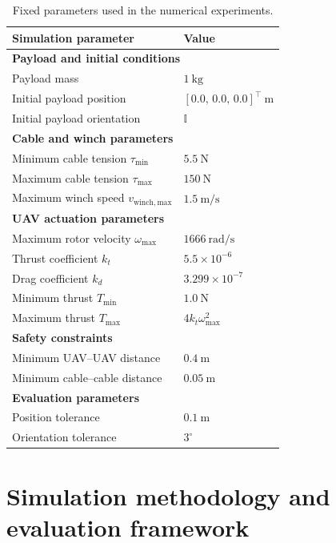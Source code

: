 \begin{table}[h]
\centering
\small
\renewcommand{\arraystretch}{0.85}
\begin{tabular}{ll}
\toprule
\textbf{Simulation parameter} & \textbf{Value} \\
\midrule
\multicolumn{2}{l}{\textbf{Payload and initial conditions}} \\
\midrule
Payload mass & $1~\mathrm{kg}$ \\
Initial payload position & $[0.0,\,0.0,\,0.0]^\top~\mathrm{m}$ \\
Initial payload orientation & $\mathbb{I}$ \\
\midrule
\multicolumn{2}{l}{\textbf{Cable and winch parameters}} \\
\midrule
Minimum cable tension $\tau_{\min}$ & $5.5~\mathrm{N}$ \\
Maximum cable tension $\tau_{\max}$ & $150~\mathrm{N}$ \\
Maximum winch speed $v_{\mathrm{winch,max}}$ & $1.5~\mathrm{m/s}$ \\
\midrule
\multicolumn{2}{l}{\textbf{UAV actuation parameters}} \\
\midrule
Maximum rotor velocity $\omega_{\max}$ & $1666~\mathrm{rad/s}$ \\
Thrust coefficient $k_t$ & $5.5\times10^{-6}$ \\
Drag coefficient $k_d$ & $3.299\times10^{-7}$ \\
Minimum thrust $T_{\min}$ & $1.0~\mathrm{N}$ \\
Maximum thrust $T_{\max}$ & $4k_t\omega_{\max}^2$ \\
\midrule
\multicolumn{2}{l}{\textbf{Safety constraints}} \\
\midrule
Minimum UAV--UAV distance & $0.4~\mathrm{m}$ \\
Minimum cable--cable distance & $0.05~\mathrm{m}$ \\
\midrule
\multicolumn{2}{l}{\textbf{Evaluation parameters}} \\
\midrule
Position tolerance & $0.1~\mathrm{m}$ \\
Orientation tolerance & $3^\circ$ \\
\bottomrule
\end{tabular}
\caption{Fixed parameters used in the numerical experiments.}
\label{tab:simulation_parameters}
\end{table}

\section{Simulation methodology and evaluation framework}

